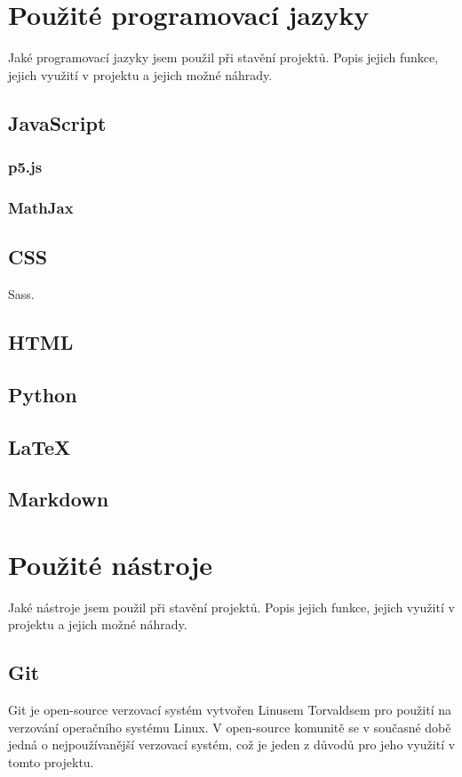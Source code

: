 \documentclass[a4paper, 12pt]{article}
\begin{document}
  \section{Použité programovací jazyky}
  Jaké programovací jazyky jsem použil při stavění projektů.
  Popis jejich funkce, jejich využití v projektu a jejich možné náhrady.

  \subsection{JavaScript}

  \subsubsection{p5.js}

  \subsubsection{MathJax}

  \subsection{CSS}
  Sass.

  \subsection{HTML}

  \subsection{Python}

  \subsection{\LaTeX{}}

  \subsection{Markdown}


  \section{Použité nástroje}
  Jaké nástroje jsem použil při stavění projektů.
  Popis jejich funkce, jejich využití v projektu a jejich možné náhrady.

  \subsection{Git} \label{sec:Git}
  Git je open-source verzovací systém vytvořen Linusem Torvaldsem pro použití na verzování operačního systému Linux. V open-source komunitě se v současné době jedná o nejpoužívanější verzovací systém\cite{version-control-usage-statistics}, což je jeden z důvodů pro jeho využití v tomto projektu.
\end{document}
